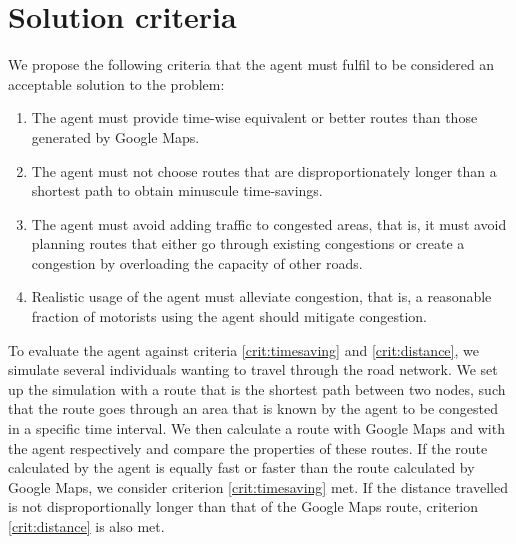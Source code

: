 \section{Solution criteria}
We propose the following criteria that the agent must fulfil to be considered an acceptable solution to the problem:

\begin{enumerate}
\item The agent must provide time-wise equivalent or better routes than those generated by Google Maps.\label{crit:timesaving}
\item The agent must not choose routes that are disproportionately longer than a shortest path to obtain minuscule time-savings.\label{crit:distance}
\item The agent must avoid adding traffic to congested areas, that is, it must avoid planning routes that either go through existing congestions or create a congestion by overloading the capacity of other roads. \label{crit:overload}
\item Realistic usage of the agent must alleviate congestion, that is, a reasonable fraction of motorists using the agent should mitigate congestion.\label{crit:congestion}
\end{enumerate}

To evaluate the agent against criteria \ref{crit:timesaving} and \ref{crit:distance}, we simulate several individuals wanting to travel through the road network. We set up the simulation with a route that is the shortest path between two nodes, such that the route goes through an area that is known by the agent to be congested in a specific time interval. We then calculate a route with Google Maps and with the agent respectively and compare the properties of these routes. If the route calculated by the agent is equally fast or faster than the route calculated by Google Maps, we consider criterion \ref{crit:timesaving} met. If the distance travelled is not disproportionally longer than that of the Google Maps route, criterion \ref{crit:distance} is also met.

